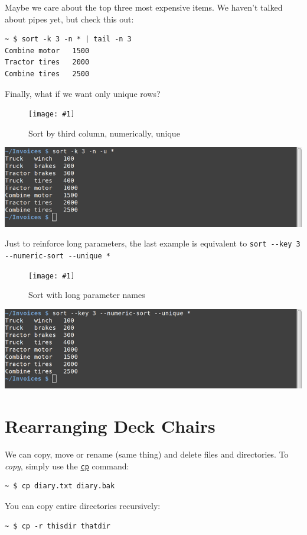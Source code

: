 \documentclass[10pt,]{book}
\numberwithin{figure}{chapter}
\DeclareRobustCommand{\fimg}[3]{
\ifxetex
\begin{figure}[H]
\texttt{[image: \#1]}
\caption{#2}
\label{fig:#3}
\end{figure}
\fi}
\DeclareRobustCommand{\fref}[1]{\ifxetex{(Figure \ref{fig:#1})}\fi}
\begin{document}
Maybe we care about the top three most expensive items. We haven't
talked about pipes yet, but check this out:

\begin{verbatim}
~ $ sort -k 3 -n * | tail -n 3
Combine motor   1500
Tractor tires   2000
Combine tires   2500
\end{verbatim}

Finally, what if we want only unique rows?~\fref{sort-k3-n-u}

\ifxetex\fimg{./images/sort-k3-n-u.png}{Sort by third column, numerically, unique}{sort-k3-n-u}
\else
\includegraphics{./images/sort-k3-n-u.png} \fi

Just to reinforce long parameters, the last example is equivalent to
\texttt{sort -{}-key 3 -{}-numeric-sort -{}-unique *}~\fref{sort-k3-n-u-long}

\ifxetex\fimg{./images/sort-k3-n-u-long.png}{Sort with long parameter names}{sort-k3-n-u-long}
\else
\includegraphics{./images/sort-k3-n-u-long.png} \fi

\section{Rearranging Deck Chairs}\label{rearranging-deck-chairs}

We can copy, move or rename (same thing) and delete files and
directories. To \emph{copy}, simply use the
\href{http://linux.die.net/man/1/cp}{\texttt{cp}} command:

\begin{verbatim}
~ $ cp diary.txt diary.bak
\end{verbatim}

You can copy entire directories recursively:

\begin{verbatim}
~ $ cp -r thisdir thatdir
\end{verbatim}
\end{document}
